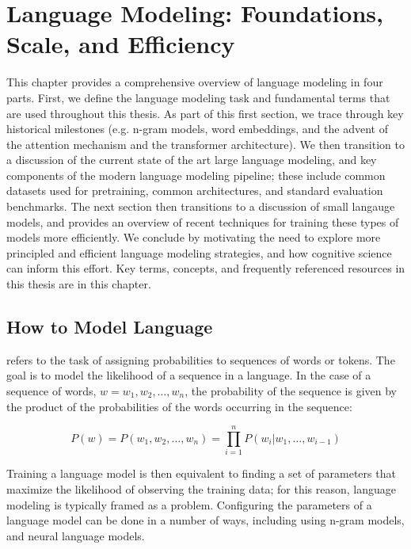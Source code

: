 \chapter{Language Modeling: Foundations, Scale, and Eﬀiciency}


This chapter provides a comprehensive overview of language modeling in four parts. First, we define the language modeling task and fundamental terms that are used throughout this thesis. As part of this first section, we trace through key historical milestones (e.g. n-gram models, word embeddings, and the advent of the attention mechanism and the transformer architecture). We then transition to a discussion of the current state of the art large language modeling, and key components of the modern language modeling pipeline; these include common datasets used for pretraining, common architectures, and standard evaluation benchmarks. The next section then transitions to a discussion of small langauge models, and provides an overview of recent techniques for training these types of models more efficiently. We conclude by motivating the need to explore more principled and efficient language modeling strategies, and how cognitive science can inform this effort. Key terms, concepts, and frequently referenced resources in this thesis are  in this chapter.

\section{How to Model Language}
\label{sec:lm-foundations}

 refers to the task of assigning probabilities to sequences of words or tokens. The goal is to model the likelihood of a sequence in a language. In the case of a sequence of words, $w = w_1, w_2, \ldots, w_n$, the probability of the sequence is given by the product of the probabilities of the words occurring in the sequence:

\begin{equation}    
    P(w) = P(w_1, w_2, \ldots, w_n) = \prod_{i=1}^n P(w_i | w_1, \ldots, w_{i-1})
\label{eq:lm-joint-distribution}
\end{equation}

Training a language model is then equivalent to finding a set of parameters that maximize the likelihood of observing the training data; for this reason, language modeling is typically framed as a  problem. Configuring the parameters of a language model can be done in a number of ways, including using n-gram models, and neural language models.

